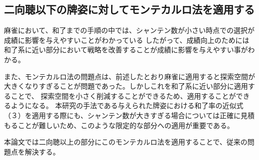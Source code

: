 \subsection{二向聴以下の牌姿に対してモンテカルロ法を適用する}

麻雀において、和了までの手順の中では、シャンテン数が小さい時点での選択が成績に影響を与えやすいことがわかっている\cite{gendai}
したがって、成績向上のためには和了系に近い部分において戦略を改善することが成績に影響を与えやすい事がわかる。

また、モンテカルロ法の問題点は、前述したとおり麻雀に適用すると探索空間が大きくなりすぎることが問題であった。しかしこれを和了系に近い部分に適用することで、
探索空間を小さく削減することができるため、適用することができるようになる。
本研究の手法である与えられた牌姿における和了率の近似式（３）を適用する際にも、シャンテン数が大きすぎる場合については正確に見積もることが難しいため、このような限定的な部分への適用が重要である。

本論文では二向聴以上の部分にこのモンテカルロ法を適用することで、従来の問題点を解決する。
